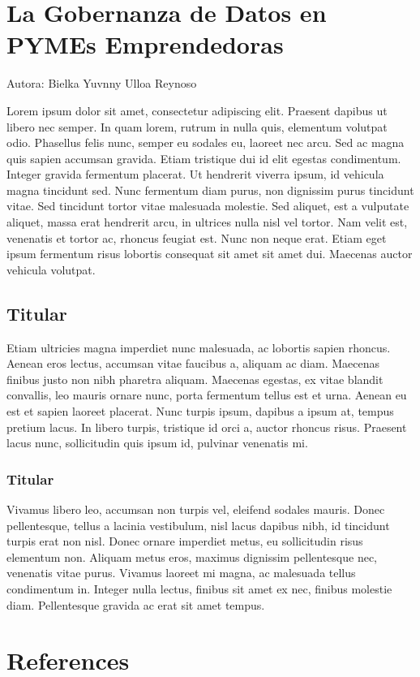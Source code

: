 \documentclass[
  letterpaper,
  DIV=11,
  numbers=noendperiod]{scrreprt}
\newlength{\cslhangindent}
\newlength{\cslentryspacingunit} %
\newenvironment{CSLReferences}[2] %
 {%
  \setlength{\parindent}{0pt}
  \ifodd #1
  \let\oldpar\par
  \def\par{\hangindent=\cslhangindent\oldpar}
  \fi
  \setlength{\parskip}{#2\cslentryspacingunit}
 }%
 {}
\begin{document}
\hypertarget{la-gobernanza-de-datos-en-pymes-emprendedoras}{%
\chapter{La Gobernanza de Datos en PYMEs
Emprendedoras}\label{la-gobernanza-de-datos-en-pymes-emprendedoras}}

Autora: Bielka Yuvnny Ulloa Reynoso

Lorem ipsum dolor sit amet, consectetur adipiscing elit. Praesent
dapibus ut libero nec semper. In quam lorem, rutrum in nulla quis,
elementum volutpat odio. Phasellus felis nunc, semper eu sodales eu,
laoreet nec arcu. Sed ac magna quis sapien accumsan gravida. Etiam
tristique dui id elit egestas condimentum. Integer gravida fermentum
placerat. Ut hendrerit viverra ipsum, id vehicula magna tincidunt sed.
Nunc fermentum diam purus, non dignissim purus tincidunt vitae. Sed
tincidunt tortor vitae malesuada molestie. Sed aliquet, est a vulputate
aliquet, massa erat hendrerit arcu, in ultrices nulla nisl vel tortor.
Nam velit est, venenatis et tortor ac, rhoncus feugiat est. Nunc non
neque erat. Etiam eget ipsum fermentum risus lobortis consequat sit amet
sit amet dui. Maecenas auctor vehicula volutpat.

\hypertarget{titular-16}{%
\section{Titular}\label{titular-16}}

Etiam ultricies magna imperdiet nunc malesuada, ac lobortis sapien
rhoncus. Aenean eros lectus, accumsan vitae faucibus a, aliquam ac diam.
Maecenas finibus justo non nibh pharetra aliquam. Maecenas egestas, ex
vitae blandit convallis, leo mauris ornare nunc, porta fermentum tellus
est et urna. Aenean eu est et sapien laoreet placerat. Nunc turpis
ipsum, dapibus a ipsum at, tempus pretium lacus. In libero turpis,
tristique id orci a, auctor rhoncus risus. Praesent lacus nunc,
sollicitudin quis ipsum id, pulvinar venenatis mi.

\hypertarget{titular-17}{%
\subsection{Titular}\label{titular-17}}

Vivamus libero leo, accumsan non turpis vel, eleifend sodales mauris.
Donec pellentesque, tellus a lacinia vestibulum, nisl lacus dapibus
nibh, id tincidunt turpis erat non nisl. Donec ornare imperdiet metus,
eu sollicitudin risus elementum non. Aliquam metus eros, maximus
dignissim pellentesque nec, venenatis vitae purus. Vivamus laoreet mi
magna, ac malesuada tellus condimentum in. Integer nulla lectus, finibus
sit amet ex nec, finibus molestie diam. Pellentesque gravida ac erat sit
amet tempus.


\hypertarget{references}{%
\chapter*{References}\label{references}}


\hypertarget{refs}{}
\begin{CSLReferences}{0}{0}
\end{CSLReferences}
\end{document}
